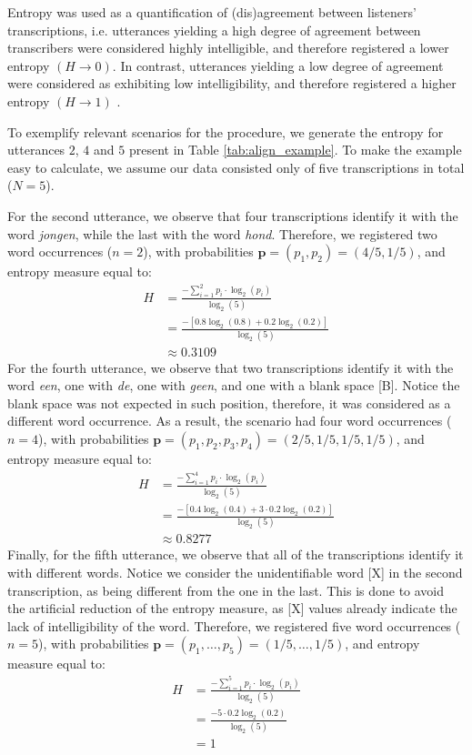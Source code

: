 Entropy was used as a quantification of (dis)agreement between listeners' transcriptions, i.e. utterances yielding a high degree of agreement between transcribers were considered highly intelligible, and therefore registered a lower entropy $\left( H \rightarrow 0 \right)$. In contrast, utterances yielding a low degree of agreement were considered as exhibiting low intelligibility, and therefore registered a higher entropy $\left( H \rightarrow 1 \right)$ \citep{Boonen_et_al_2021, Faes_et_al_2021}. 

To exemplify relevant scenarios for the procedure, we generate the entropy for utterances $2$, $4$ and $5$ present in Table \ref{tab:align_example}. To make the example easy to calculate, we assume our data consisted only of five transcriptions in total ($N=5$).

For the second utterance, we observe that four transcriptions identify it with the word \textit{jongen}, while the last with the word \textit{hond}. Therefore, we registered two word occurrences ($n=2$), with probabilities $\pmb{p} = (p_{1}, p_{2}) = (4/5, 1/5)$, and entropy measure equal to:
%
\begin{align*}
	H &= \frac{-\sum_{i=1}^{2} p_{i} \cdot \log_{2}(p_{i})}{\log_{2}(5)} \\
	&= \frac{- \left[ 0.8 \log_{2}(0.8) + 0.2 \log_{2}(0.2) \right] }{\log_{2}(5)} \\
	&\approx 0.3109
\end{align*} 
%
For the fourth utterance, we observe that two transcriptions identify it with the word \textit{een}, one with \textit{de}, one with \textit{geen}, and one with a blank space [B]. Notice the blank space was not expected in such position, therefore, it was considered as a different word occurrence. As a result, the scenario had four word occurrences ($n=4$), with probabilities $\pmb{p} = (p_{1}, p_{2}, p_{3}, p_{4}) = (2/5, 1/5, 1/5, 1/5)$, and entropy measure equal to:
%
\begin{align*}
	H &= \frac{-\sum_{i=1}^{4} p_{i} \cdot \log_{2}(p_{i})}{\log_{2}(5)} \\
	&= \frac{- \left[ 0.4 \log_{2}(0.4) + 3 \cdot 0.2 \log_{2}(0.2) \right] }{\log_{2}(5)} \\
	&\approx 0.8277
\end{align*} 
%
Finally, for the fifth utterance, we observe that all of the  transcriptions identify it with different words. Notice we consider the unidentifiable word [X] in the second transcription, as being different from the one in the last. This is done to avoid the artificial reduction of the entropy measure, as [X] values already indicate the lack of intelligibility of the word. Therefore, we registered five word occurrences ($n=5$), with probabilities $\pmb{p} = (p_{1}, \dots, p_{5}) = (1/5, \dots, 1/5)$, and entropy measure equal to:
%
\begin{align*}
	H &= \frac{-\sum_{i=1}^{5} p_{i} \cdot \log_{2}(p_{i})}{\log_{2}(5)} \\
	&= \frac{- 5 \cdot 0.2 \log_{2}(0.2) }{\log_{2}(5)} \\
	&= 1
\end{align*} 
%
%
